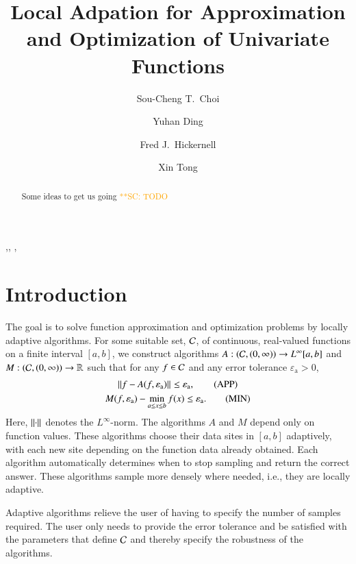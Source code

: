 \documentclass[review]{elsarticle}
\newcommand{\abstol}{\varepsilon_{\textrm{a}}}
\theoremstyle{definition}
\newcommand{\scnote}[1]{ {\textcolor{orange}  {\mbox{**SC:} #1}}}
\begin{document}
\begin{frontmatter}

\title{Local Adpation for Approximation and Optimization of Univariate Functions}


\author{Sou-Cheng T.~Choi}
\author{Yuhan Ding}
\author{Fred J.~Hickernell}
\author{Xin Tong}
\address{Department of Applied Mathematics, Illinois Institute of Technology, RE 208, 10 West 32$^{\text{nd}}$ Street, Chicago, Illinois, 60616, USA}

\begin{abstract}
Some ideas to get us going \scnote{TODO}
\end{abstract}

\begin{keyword}
\sep \sep
\MSC[2010]  \sep
\end{keyword}

\end{frontmatter}

\section{Introduction} \label{sec:intro}

The goal is to solve  function approximation and optimization problems by locally adaptive algorithms. For some suitable set, $\mathcal{C}$, of continuous,
real-valued functions on a finite interval $[a,b]$, we  construct
algorithms $A:(\mathcal{C},(0,\infty)) \to L^{\infty}[a,b]$ and $M: (\mathcal{C},(0,\infty)) \to
\mathbb{R}$ such that for any $f \in \mathcal{C}$ and any error tolerance $\abstol > 0$,
\begin{gather}
\norm{f - A(f,\abstol)} \le \abstol,  \tag{APP} \label{appxprob} \\
M(f,\abstol) - \min_{a \le x \le b} f(x)  \le \abstol. \tag{MIN} \label{optprob}
\end{gather}
Here, $\left \lVert \cdot \right \rVert_{{}}$ denotes the $L^{\infty}$-norm.  The algorithms $A$ and $M$ depend only on function values. These algorithms choose their data sites in $[a,b]$ adaptively, with each new site depending on the function data already obtained.  Each algorithm  automatically determines when to stop sampling
and return the correct answer.  These algorithms sample more densely where needed, i.e., they are locally adaptive.

Adaptive algorithms relieve the user of having to specify the number of samples required.  The user only needs to provide the error tolerance and be satisfied with the parameters that define $\mathcal{C}$ and thereby specify the robustness of the algorithms.
\end{document}
